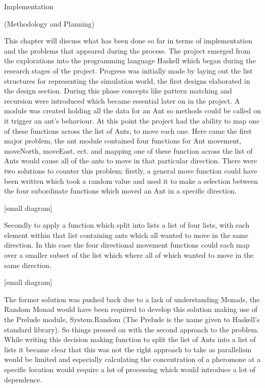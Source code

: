 \documentclass[main.tex]{subfiles}
\begin{document}
Implementation

(Methodology and Planning)     

This chapter will discuss what has been done so far in terms of implementation and the problems that appeared during the process. The project emerged from the explorations into the programming language Haskell which began during the research stages of the project. Progress was initially made by laying out the list structures for representing the simulation world, the first designs elaborated in the design section. During this phase concepts like pattern matching and recursion were introduced which became essential later on in the project. A module was created holding all the data for an Ant so methods could be called on it trigger an ant's behaviour. At this point the project had the ability to map one of these functions across the list of Ants, to move each one. Here came the first major problem, the ant module contained four functions for Ant movement, moveNorth, moveEast, ect. and mapping one of these function across the list of Ants would cause all of the ants to move in that particular direction. There were two solutions to counter this problem; firstly, a general move function could have been written which took a random value and used it to make a selection between the four subordinate functions which moved an Ant in a specific direction. 

[small diagram] 

Secondly to apply a function which split into lists a list of four lists, with each element within that list containing ants which all wanted to move in the same direction. In this case the four directional movement functions could each map over a smaller subset of the list which where all of which wanted to move in the same direction. 

[small diagram] 

The former solution was pushed back due to a lack of understanding Monads, the Random Monad would have been required to develop this solution making use of the Prelude module, System.Random (The Prelude is the name given to Haskell's standard library). So things pressed on with the second approach to the problem. While writing this decision making function to split the list of Ants into a list of lists it became clear that this was not the right approach to take as parallelism would be limited and especially calculating the concentration of a pheromone at a specific location would require a lot of processing which would  introduce a lot of dependence. 
\end{document}
